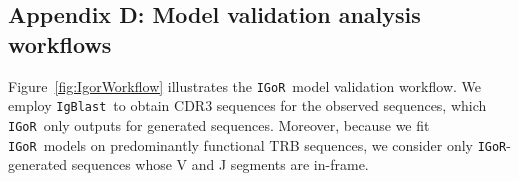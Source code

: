 \documentclass{article}
\newcommand{\igor}{\texttt{IGoR}}
\newcommand{\igblast}{\texttt{IgBlast}}
\begin{document}
\subsection*{Appendix D: Model validation analysis workflows}
Figure~\ref{fig:IgorWorkflow} illustrates the \igor\ model validation workflow.
We employ \igblast\ to obtain CDR3 sequences for the observed sequences, which \igor\ only outputs for generated sequences.
Moreover, because we fit \igor\ models on predominantly functional TRB sequences, we consider only \igor-generated sequences whose V and J segments are in-frame.

\end{document}
